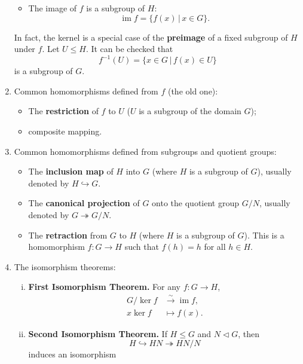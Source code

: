 \begin{enumerate}[(1)]
\begin{itemize}
\begin{equation*}
		\end{equation*}
		\item The image of $f$ is a subgroup of $H$:
		\begin{equation*}
			\operatorname{im} f = \{f(x)\,|\, x\in G\}.
		\end{equation*}
	\end{itemize}
	In fact, the kernel is a special case of the \textbf{preimage} of a fixed subgroup of $H$ under $f$. Let $U\leq H$. It can be checked that
	\begin{equation*}
		f^{-1}(U) = \{x\in G\,|\, f(x)\in U\}
	\end{equation*}
	is a subgroup of $G$.
	\item Common homomorphisms defined from $f$ (the old one):
	\begin{itemize}
		\item The \textbf{restriction} of $f$ to $U$ ($U$ is a subgroup of the domain $G$);
		\item composite mapping.
	\end{itemize}
	\item Common homomorphisms defined from subgroups and quotient groups:
	\begin{itemize}
		\item The \textbf{inclusion map} of $H$ into $G$ (where $H$ is a subgroup of $G$), usually denoted by $H\hookrightarrow G$.
		\item The \textbf{canonical projection} of $G$ onto the quotient group $G/N$, usually denoted by $G \twoheadrightarrow G/N$.
		\item  The \textbf{retraction} from $G$  to $H$ (where $H$ is a subgroup of $G$). This is a homomorphism $f:G\rightarrow H$ such that $f(h)=h$ for all $h\in H$.
	\end{itemize}
	\item The isomorphism theorems:
	\begin{enumerate}[(i)]
		\item \textbf{First Isomorphism Theorem.} For any $f:G\rightarrow H$,
		\begin{align*}
			G/\operatorname{ker} f &\stackrel{\sim}{\rightarrow} \operatorname{im} f,\\
			x \operatorname{ker} f& \mapsto f(x).
		\end{align*}
		\item \textbf{Second Isomorphism Theorem.} If $H\leq G$ and $N\lhd G$, then $$H\hookrightarrow HN \twoheadrightarrow HN/N$$ induces an isomorphism
		\begin{equation*}

\end{equation*}
\end{enumerate}
\end{enumerate}
